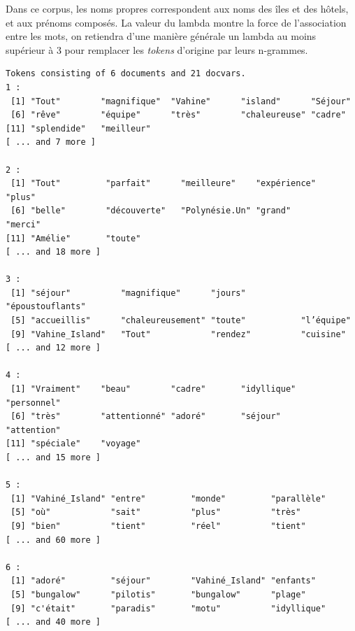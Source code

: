 \documentclass[
  letterpaper,
  DIV=11,
  numbers=noendperiod]{scrreprt}
\newenvironment{Shaded}{\begin{snugshade}}{\end{snugshade}}
\newcommand{\AttributeTok}[1]{\textcolor[rgb]{0.40,0.45,0.13}{#1}}
\newcommand{\ConstantTok}[1]{\textcolor[rgb]{0.56,0.35,0.01}{#1}}
\newcommand{\DecValTok}[1]{\textcolor[rgb]{0.68,0.00,0.00}{#1}}
\newcommand{\FunctionTok}[1]{\textcolor[rgb]{0.28,0.35,0.67}{#1}}
\newcommand{\NormalTok}[1]{\textcolor[rgb]{0.00,0.23,0.31}{#1}}
\newcommand{\OtherTok}[1]{\textcolor[rgb]{0.00,0.23,0.31}{#1}}
\newcommand{\SpecialCharTok}[1]{\textcolor[rgb]{0.37,0.37,0.37}{#1}}
\begin{document}
Dans ce corpus, les noms propres correspondent aux noms des îles et des
hôtels, et aux prénoms composés. La valeur du lambda montre la force de
l'association entre les mots, on retiendra d'une manière générale un
lambda au moins supérieur à 3 pour remplacer les \emph{tokens} d'origine
par leurs n-grammes.

\begin{Shaded}
\end{Shaded}

\begin{verbatim}
Tokens consisting of 6 documents and 21 docvars.
1 :
 [1] "Tout"        "magnifique"  "Vahine"      "island"      "Séjour"     
 [6] "rêve"        "équipe"      "très"        "chaleureuse" "cadre"      
[11] "splendide"   "meilleur"   
[ ... and 7 more ]

2 :
 [1] "Tout"         "parfait"      "meilleure"    "expérience"   "plus"        
 [6] "belle"        "découverte"   "Polynésie.Un" "grand"        "merci"       
[11] "Amélie"       "toute"       
[ ... and 18 more ]

3 :
 [1] "séjour"          "magnifique"      "jours"           "époustouflants" 
 [5] "accueillis"      "chaleureusement" "toute"           "l’équipe"       
 [9] "Vahine_Island"   "Tout"            "rendez"          "cuisine"        
[ ... and 12 more ]

4 :
 [1] "Vraiment"    "beau"        "cadre"       "idyllique"   "personnel"  
 [6] "très"        "attentionné" "adoré"       "séjour"      "attention"  
[11] "spéciale"    "voyage"     
[ ... and 15 more ]

5 :
 [1] "Vahiné_Island" "entre"         "monde"         "parallèle"    
 [5] "où"            "sait"          "plus"          "très"         
 [9] "bien"          "tient"         "réel"          "tient"        
[ ... and 60 more ]

6 :
 [1] "adoré"         "séjour"        "Vahiné_Island" "enfants"      
 [5] "bungalow"      "pilotis"       "bungalow"      "plage"        
 [9] "c'était"       "paradis"       "motu"          "idyllique"    
[ ... and 40 more ]
\end{verbatim}
\end{document}
